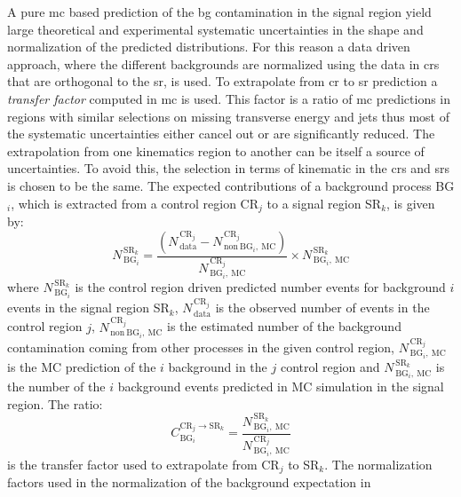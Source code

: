 A pure \gls{mc} based prediction of the \gls{bg} contamination in the signal
region yield large theoretical and experimental systematic uncertainties in the
shape and normalization of the predicted distributions. For this reason a data
driven approach, where the different backgrounds are normalized using the data
in \glspl{cr} that are orthogonal to the \gls{sr}, is used. To extrapolate from
\gls{cr} to \gls{sr} prediction a \emph{transfer factor} computed in \gls{mc} is
used. This factor is a ratio of \gls{mc} predictions in regions with similar
selections on missing transverse energy and jets thus most of the systematic
uncertainties either cancel out or are significantly reduced. The extrapolation
from one kinematics region to another can be itself a source of uncertainties.
To avoid this, the selection in terms of kinematic in the \glspl{cr} and
\glspl{sr} is chosen to be the same. The expected contributions of a background
process BG$_i$, which is extracted from a control region CR$_j$ to a signal
region SR$_k$, is given by:
\begin{equation}
  \label{eq:100}
  N_{\mathrm{\, BG}_i}^{\mathrm{\, SR}_k} = \frac{(N_\mathrm{\,
      data}^{\mathrm{\, CR}_j} - N_{\mathrm{\,
        non~BG}_i,~\mathrm{MC}}^{\mathrm{\, CR}_j})}
  {N^{\mathrm{\, CR}_j}_{\mathrm{\, BG}_i \mathrm{,~MC}}} \times
  N^{\mathrm{\, SR}_k}_{\mathrm{\, BG}_i,~\mathrm{MC}}
\end{equation}
where $N_{\mathrm{\, BG}_i}^{\mathrm{\, SR}_k}$ is the control region driven
predicted number events for background $i$ events in the signal region SR$_k$,
$N_\mathrm{\, data}^{\mathrm{\, CR}_j}$ is the observed number of events in the
control region $j$, $N_{\mathrm{\, non~BG}_i,~\mathrm{MC}}^{\mathrm{\, CR}_j}$
is the estimated number of the background contamination coming from other
processes in the given control region,
$N^{\mathrm{\, CR}_j}_{\mathrm{\, BG}_i \mathrm{,~MC}}$ is the MC prediction of
the $i$ background in the $j$ control region and
$N^{\mathrm{\, SR}_k}_{\mathrm{\, BG}_i,~\mathrm{MC}}$ is the number of the $i$
background events predicted in MC simulation in the signal region. The ratio:
\begin{equation}
  \label{eq:101}
  C_{\mathrm{BG}_i}^{\mathrm{CR}_j \rightarrow \mathrm{SR}_k} = \frac{
    N^{\mathrm{\, SR}_k}_{\mathrm{\, BG}_i,~\mathrm{MC}}}{N^{\mathrm{\,
        CR}_j}_{\mathrm{\, BG}_i \mathrm{,~MC}}}
\end{equation}
is the transfer factor used to extrapolate from CR$_j$ to SR$_k$. The
normalization factors used in the normalization of the background expectation in
